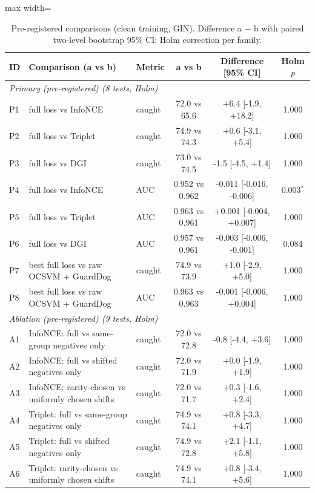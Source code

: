 \begin{table}[htbp]
\centering
\scriptsize
\caption{Pre-registered comparisons (clean training, GIN). Difference a $-$ b with paired two-level bootstrap 95\% CI; Holm correction per family.}
\label{tab:primary}
\begin{adjustbox}{max width=\linewidth}
\begin{tabular}{lp{6.2cm}lccc}
\toprule
ID & Comparison (a vs b) & Metric & a vs b & Difference [95\% CI] & Holm $p$ \\
\midrule
\multicolumn{6}{l}{\textit{Primary (pre-registered) (8 tests, Holm)}} \\
P1 & full loss vs InfoNCE & caught & 72.0 vs 65.6 & +6.4 [-1.9, +18.2] & 1.000 \\
P2 & full loss vs Triplet & caught & 74.9 vs 74.3 & +0.6 [-3.1, +5.4] & 1.000 \\
P3 & full loss vs DGI & caught & 73.0 vs 74.5 & -1.5 [-4.5, +1.4] & 1.000 \\
P4 & full loss vs InfoNCE & AUC & 0.952 vs 0.962 & -0.011 [-0.016, -0.006] & 0.003$^{*}$ \\
P5 & full loss vs Triplet & AUC & 0.963 vs 0.961 & +0.001 [-0.004, +0.007] & 1.000 \\
P6 & full loss vs DGI & AUC & 0.957 vs 0.961 & -0.003 [-0.006, -0.001] & 0.084 \\
P7 & best full loss vs raw OCSVM + GuardDog & caught & 74.9 vs 73.9 & +1.0 [-2.9, +5.0] & 1.000 \\
P8 & best full loss vs raw OCSVM + GuardDog & AUC & 0.963 vs 0.963 & -0.001 [-0.006, +0.004] & 1.000 \\
\multicolumn{6}{l}{\textit{Ablation (pre-registered) (9 tests, Holm)}} \\
A1 & InfoNCE: full vs same-group negatives only & caught & 72.0 vs 72.8 & -0.8 [-4.4, +3.6] & 1.000 \\
A2 & InfoNCE: full vs shifted negatives only & caught & 72.0 vs 71.9 & +0.0 [-1.9, +1.9] & 1.000 \\
A3 & InfoNCE: rarity-chosen vs uniformly chosen shifts & caught & 72.0 vs 71.7 & +0.3 [-1.6, +2.4] & 1.000 \\
A4 & Triplet: full vs same-group negatives only & caught & 74.9 vs 74.1 & +0.8 [-3.3, +4.7] & 1.000 \\
A5 & Triplet: full vs shifted negatives only & caught & 74.9 vs 72.8 & +2.1 [-1.1, +5.8] & 1.000 \\
A6 & Triplet: rarity-chosen vs uniformly chosen shifts & caught & 74.9 vs 74.1 & +0.8 [-3.4, +5.6] & 1.000 \\

\end{tabular}
\end{adjustbox}
\end{table}
